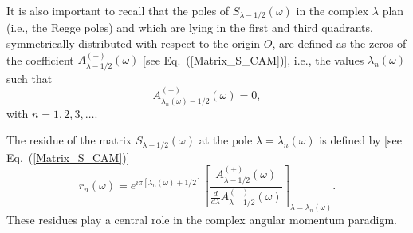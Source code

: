 \documentclass[aps,prd,longbibliography,reprint,twocolumn,amsmath,amssymb,amsfonts,showpacs,footnote,superscriptaddress]{revtex4-1}%
\begin{document}
It is also important to recall that the poles of  $S_{\lambda-1/2}(\omega)$ in the complex $\lambda$ plan (i.e., the Regge poles) and which are lying in the first and third quadrants, symmetrically distributed with respect to the origin $O$, are defined  as  the zeros of the coefficient  $A^{(-)}_{\lambda-1/2} (\omega)$ [see Eq.~(\ref{Matrix_S_CAM})], i.e., the values $\lambda_n(\omega)$ such that
\begin{equation}\label{PR_def_Am}
A^{(-)}_{\lambda_n(\omega)-1/2} (\omega)=0,
\end{equation}
with $n=1,2,3,\ldots$.

The residue of the matrix $S_{\lambda-1/2}(\omega)$ at the pole $\lambda=\lambda_n(\omega)$ is defined by [see Eq.~(\ref{Matrix_S_CAM})]
\begin{equation}\label{residues_RP}
r_n(\omega)=e^{i\pi [\lambda_n(\omega)+1/2]} \left[ \frac{A_{\lambda -1/2}^{(+)}(\omega)}{\frac{d}{d \lambda}A_{\lambda -1/2}^{(-)}(\omega)}\right]_{\lambda=\lambda_n(\omega)}.
\end{equation}
These residues play a central role in the complex angular momentum paradigm.
\end{document}
